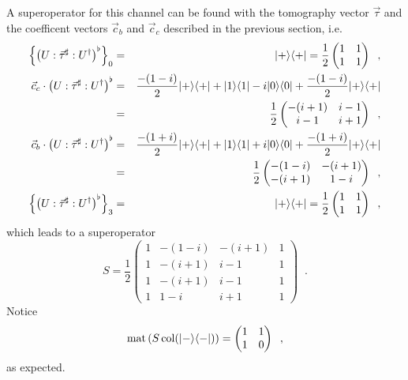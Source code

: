 A superoperator for this channel can be found with the tomography vector $\vec{\tau}$ and the coefficent vectors $\vec{c}_b$ and $\vec{c}_c$ described in the previous section, i.e.\
\begin{eqnarray*}
\left\{\left(U:\vec{\tau}^\sharp:U^\dagger\right)^\flat\right\}_0 &=& |+\rangle\langle+|=\frac{1}{2}\begin{pmatrix}
1&1\\
1&1
\end{pmatrix}\;\;,\\
\vec{c}_c\cdot\left(U:\vec{\tau}^\sharp:U^\dagger\right)^\flat &=& \frac{-(1-i)}{2}|+\rangle\langle+|+|1\rangle\langle1|-i|0\rangle\langle0|+\frac{-(1-i)}{2}|+\rangle\langle+|\\
&=&\frac{1}{2}\begin{pmatrix}
-(i+1)&i-1\\
i-1&i+1
\end{pmatrix}\;\;,\\
\vec{c}_b\cdot\left(U:\vec{\tau}^\sharp:U^\dagger\right)^\flat &=& \frac{-(1+i)}{2}|+\rangle\langle+|+|1\rangle\langle1|+i|0\rangle\langle0|+\frac{-(1+i)}{2}|+\rangle\langle+|\\
&=&\frac{1}{2}\begin{pmatrix}
-(1-i)&-(i+1)\\
-(i+1)&1-i
\end{pmatrix}\;\;,\\
\left\{\left(U:\vec{\tau}^\sharp:U^\dagger\right)^\flat\right\}_3 &=& |+\rangle\langle+|=\frac{1}{2}\begin{pmatrix}
1&1\\
1&1
\end{pmatrix}\;\;,\\
\end{eqnarray*}
which leads to a superoperator
$$
S = \frac{1}{2}\begin{pmatrix}
1&-(1-i)&-(i+1)&1\\
1&-(i+1)&i-1&1\\
1&-(i+1)&i-1&1\\
1&1-i&i+1&1
\end{pmatrix}\;\;.
$$
Notice
$$
\operatorname{mat}\left(S\operatorname{col}(|-\rangle\langle-|)\right) =\begin{pmatrix}
1&1\\
1&0
\end{pmatrix}\;\;,
$$
as expected.

